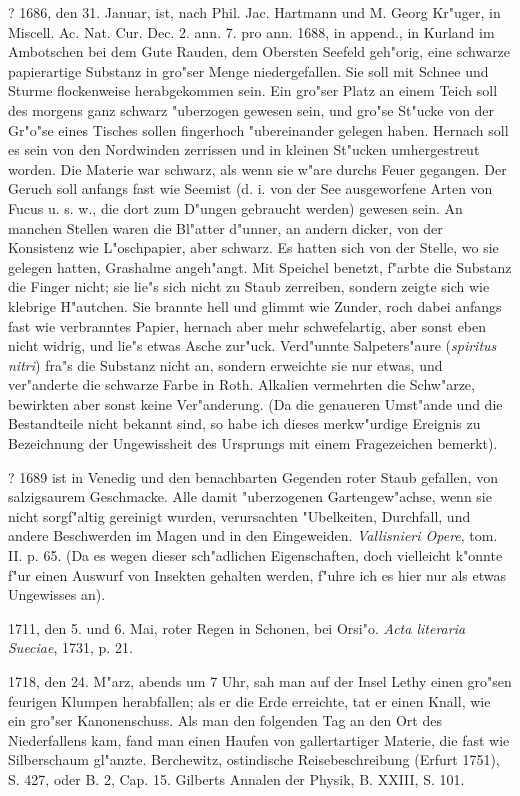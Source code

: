 \documentclass[a4paper, 11pt, oneside, polutonikogreek, german]{article}
\begin{document}
? 1686, den 31. Januar, ist, nach Phil. Jac. Hartmann und M. Georg Kr"uger, in Miscell. Ac. Nat. Cur. Dec. 2. ann. 7. pro ann. 1688, in append., in Kurland im Ambotschen bei dem Gute Rauden, dem Obersten Seefeld geh"orig, eine schwarze papierartige Substanz in gro"ser Menge niedergefallen. Sie soll mit Schnee und Sturme flockenweise herabgekommen sein. Ein gro"ser Platz an einem Teich soll des morgens ganz schwarz "uberzogen gewesen sein, und gro"se St"ucke von der Gr"o"se eines Tisches sollen fingerhoch "ubereinander gelegen haben. Hernach soll es sein von den Nordwinden zerrissen und in kleinen St"ucken umhergestreut worden. Die Materie war schwarz, als wenn sie w"are durchs Feuer gegangen. Der Geruch soll anfangs fast wie Seemist (d. i. von der See ausgeworfene Arten von Fucus u. s. w., die dort zum D"ungen gebraucht werden) gewesen sein. An manchen Stellen waren die Bl"atter d"unner, an andern dicker, von der Konsistenz wie L"oschpapier, aber schwarz. Es hatten sich von der Stelle, wo sie gelegen hatten, Grashalme angeh"angt. Mit Speichel benetzt, f"arbte die Substanz die Finger nicht; sie lie"s sich nicht zu Staub zerreiben, sondern zeigte sich wie klebrige H"autchen. Sie brannte hell und glimmt wie Zunder, roch dabei anfangs fast wie verbranntes Papier, hernach aber mehr schwefelartig, aber sonst eben nicht widrig, und lie"s etwas Asche zur"uck. Verd"unnte Salpeters"aure (\emph{spiritus nitri}) fra"s die Substanz nicht an, sondern erweichte sie nur etwas, und ver"anderte die schwarze Farbe in Roth. Alkalien vermehrten die Schw"arze, bewirkten aber sonst keine Ver"anderung. (Da die genaueren Umst"ande und die Bestandteile nicht bekannt sind, so habe ich dieses merkw"urdige Ereignis zu Bezeichnung der Ungewissheit des Ursprungs mit einem Fragezeichen bemerkt).

? 1689 ist in Venedig und den benachbarten Gegenden roter Staub gefallen, von salzigsaurem Geschmacke. Alle damit "uberzogenen Gartengew"achse, wenn sie nicht sorgf"altig gereinigt wurden, verursachten "Ubelkeiten, Durchfall, und andere Beschwerden im Magen und in den Eingeweiden. \emph{Vallisnieri Opere}, tom. II. p. 65. (Da es wegen dieser sch"adlichen Eigenschaften, doch vielleicht k"onnte f"ur einen Auswurf von Insekten gehalten werden, f"uhre ich es hier nur als etwas Ungewisses an).

1711, den 5. und 6. Mai, roter Regen in Schonen, bei Orsi"o. \emph{Acta literaria Sueciae}, 1731, p. 21.

1718, den 24. M"arz, abends um 7 Uhr, sah man auf der Insel Lethy einen gro"sen feurigen Klumpen herabfallen; als er die Erde erreichte, tat er einen Knall, wie ein gro"ser Kanonenschuss. Als man den folgenden Tag an den Ort des Niederfallens kam, fand man einen Haufen von gallertartiger Materie, die fast wie Silberschaum gl"anzte. Berchewitz, ostindische Reisebeschreibung (Erfurt 1751), S. 427, oder B. 2, Cap. 15. Gilberts Annalen der Physik, B. XXIII, S. 101.
\end{document}
